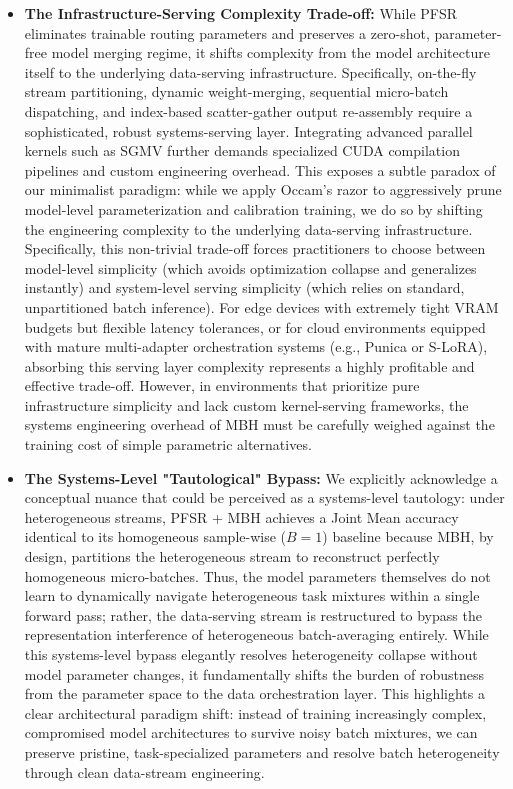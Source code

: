 \begin{itemize}
    materialization and Top-$1$ fallback strategies remain the recommended, dependency-free paths to
    deploy dynamic weight-space merging.
    \item \textbf{The Infrastructure-Serving Complexity Trade-off:} While PFSR eliminates trainable routing parameters and preserves a zero-shot, parameter-free model merging regime, it shifts complexity from the model architecture itself to the underlying data-serving infrastructure. Specifically, on-the-fly stream partitioning, dynamic weight-merging, sequential micro-batch dispatching, and index-based scatter-gather output re-assembly require a sophisticated, robust systems-serving layer. Integrating advanced parallel kernels such as SGMV further demands specialized CUDA compilation pipelines and custom engineering overhead. This exposes a subtle paradox of our minimalist paradigm: while we apply Occam's razor to aggressively prune model-level parameterization and calibration training, we do so by shifting the engineering complexity to the underlying data-serving infrastructure. Specifically, this non-trivial trade-off forces practitioners to choose between model-level simplicity (which avoids optimization collapse and generalizes instantly) and system-level serving simplicity (which relies on standard, unpartitioned batch inference). For edge devices with extremely tight VRAM budgets but flexible latency tolerances, or for cloud environments equipped with mature multi-adapter orchestration systems (e.g., Punica or S-LoRA), absorbing this serving layer complexity represents a highly profitable and effective trade-off. However, in environments that prioritize pure infrastructure simplicity and lack custom kernel-serving frameworks, the systems engineering overhead of MBH must be carefully weighed against the training cost of simple parametric alternatives.
    \item \textbf{The Systems-Level "Tautological" Bypass:} We explicitly acknowledge a conceptual nuance that could be perceived as a systems-level tautology: under heterogeneous streams, PFSR + MBH achieves a Joint Mean accuracy identical to its homogeneous sample-wise ($B=1$) baseline because MBH, by design, partitions the heterogeneous stream to reconstruct perfectly homogeneous micro-batches. Thus, the model parameters themselves do not learn to dynamically navigate heterogeneous task mixtures within a single forward pass; rather, the data-serving stream is restructured to bypass the representation interference of heterogeneous batch-averaging entirely. While this systems-level bypass elegantly resolves heterogeneity collapse without model parameter changes, it fundamentally shifts the burden of robustness from the parameter space to the data orchestration layer. This highlights a clear architectural paradigm shift: instead of training increasingly complex, compromised model architectures to survive noisy batch mixtures, we can preserve pristine, task-specialized parameters and resolve batch heterogeneity through clean data-stream engineering.

\end{itemize}
